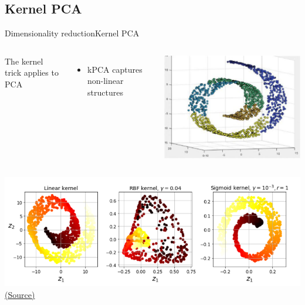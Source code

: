 \documentclass[10pt,compress]{beamer} %
\begin{document}


\subsection{Kernel PCA}
\begin{frame}{Dimensionality reduction}{Kernel PCA}
    \begin{columns}
	        The kernel trick applies to PCA
		    \begin{itemize}
            \item kPCA captures non-linear structures
		    \end{itemize}

	        \includegraphics[width=\linewidth]{figs/swiss.jpeg}\\
    \end{columns}

    \centering
	\includegraphics[width=\linewidth]{figs/kpca.png}
   	\tiny{\href{https://www.oreilly.com/library/view/hands-on-machine-learning/9781492032632/}{(Source)}}
\end{frame}
\end{document}
